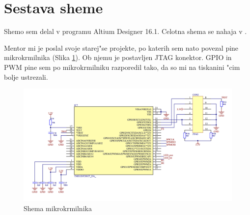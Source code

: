 \documentclass[a4paper]{article}
\begin{document}
%
%
%
%
%
%

\section{Sestava sheme}
\label{shema}
Shemo sem delal v programu Altium Designer 16.1. Celotna shema se nahaja v .




Mentor mi je poslal svoje starej"se projekte, po katerih sem nato povezal pine mikrokrmilnika (Slika \ref{fig:uCshema}). Ob njemu je postavljen JTAG konektor. GPIO in PWM pine sem po mikrokrmilniku razporedil tako, da so mi na tiskanini "cim bolje ustrezali.
	\begin{figure}[h!]
		\centering
		\includegraphics[width=\textwidth]{uC.png}
		\caption{Shema mikrokrmilnika}
		\label{fig:uCshema}
	\end{figure}
\end{document}
